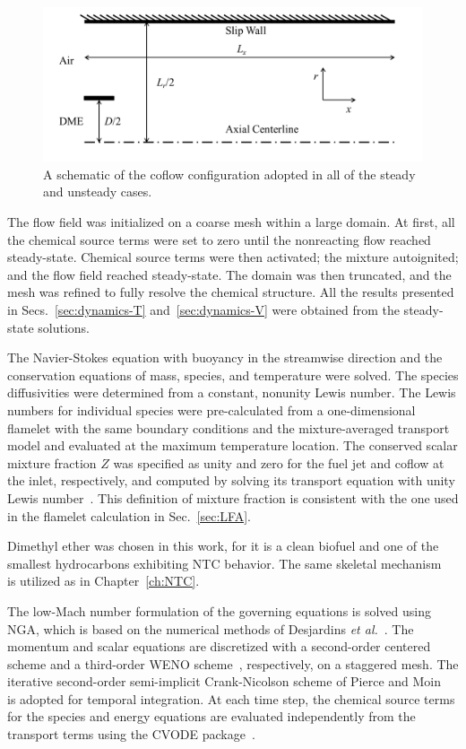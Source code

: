 \begin{figure}[t]
  \centering
  \scriptsize
  \includegraphics[width=1.0\textwidth]{ch-dynamics/coflow.png}
  \normalsize
  \caption{A schematic of the coflow configuration adopted in all of the steady and unsteady cases.}
  \label{fig:coflow}
\end{figure}

The flow field was initialized on a coarse mesh within a large domain.  At first, all the chemical source terms were set to zero until the nonreacting flow reached steady-state.  Chemical source terms were then activated; the mixture autoignited; and the flow field reached steady-state.  The domain was then truncated, and the mesh was refined to fully resolve the chemical structure.  All the results presented in Secs.~\ref{sec:dynamics-T} and~\ref{sec:dynamics-V} were obtained from the steady-state solutions.  

The Navier-Stokes equation with buoyancy in the streamwise direction and the conservation equations of mass, species, and temperature were solved.  The species diffusivities were determined from a constant, nonunity Lewis number.  The Lewis numbers for individual species were pre-calculated from a one-dimensional flamelet with the same boundary conditions and the mixture-averaged transport model and evaluated at the maximum temperature location.  The conserved scalar mixture fraction $Z$ was specified as unity and zero for the fuel jet and coflow at the inlet, respectively, and computed by solving its transport equation with unity Lewis number~\cite{pitsch98b}.  This definition of mixture fraction is consistent with the one used in the flamelet calculation in Sec.~\ref{sec:LFA}.

Dimethyl ether was chosen in this work, for it is a clean biofuel and one of the smallest hydrocarbons exhibiting NTC behavior.  The same skeletal mechanism~\cite{bhagatwala15} is utilized as in Chapter~\ref{ch:NTC}.

The low-Mach number formulation of the governing equations is solved using NGA, which is based on the numerical methods of Desjardins \emph{et al.}~\cite{desjardins08}.  The momentum and scalar equations are discretized with a second-order centered scheme and a third-order WENO scheme~\cite{liu94}, respectively, on a staggered mesh.  The iterative second-order semi-implicit Crank-Nicolson scheme of Pierce and Moin~\cite{pierce01} is adopted for temporal integration.  At each time step, the chemical source terms for the species and energy equations are evaluated independently from the transport terms using the CVODE package~\cite{cohen96}.

